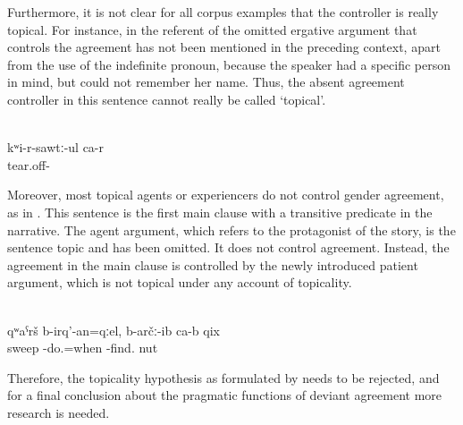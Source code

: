 Furthermore, it is not clear for all corpus examples that the controller is really topical. For instance, in  the referent of the omitted ergative argument that controls the agreement has not been mentioned in the preceding context, apart from the use of the indefinite pronoun, because the speaker had a specific person in mind, but could not remember her name. Thus, the absent agreement controller in this sentence cannot really be called `topical'.
%
\begin{exe}
	\ex	{[To someone (= a woman whose name the speaker forgot) I said, well I will wash (my legs)]}\\	\label{ex:‎‎She takes (the jug) out of my hands (and washes my legs)}
	\gll	kʷi-r-sawtː-ul	ca-r\\
		tear.off-	\\
	\glt	{}
\end{exe}

Moreover, most topical agents or experiencers do not control gender agreement, as in . This sentence is the first main clause with a transitive predicate in the narrative. The agent argument, which refers to the protagonist of the story, is the sentence topic and has been omitted. It does not control agreement. Instead, the agreement in the main clause is controlled by the newly introduced patient argument, which is not topical under any account of topicality.

\begin{exe}
	 \\ \label{ex:When she was sweeping, she found a walnut.} 
	\gll	qʷaˁrš	b-irq'-an=qːel,	b-arčː-ib	ca-b	qix\\
		sweep	-do.=when	-find.		nut\\
	\glt	{}
\end{exe}

Therefore, the topicality hypothesis as formulated by \citet{Sumbatova.Lander2014} needs to be rejected, and for a final conclusion about the pragmatic functions of deviant agreement more research is needed.

